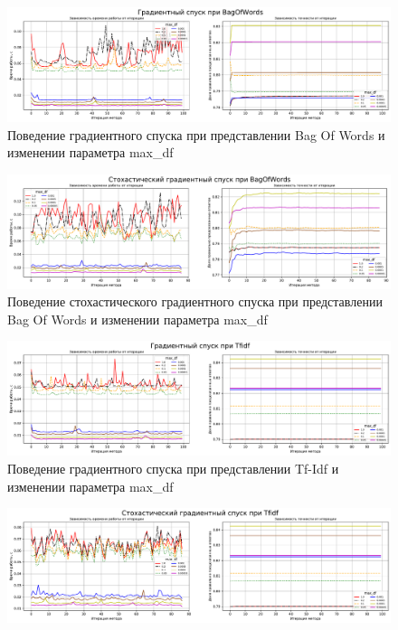\documentclass{article}
\begin{document}
\begin{itemize}
\begin{figure}[H]
	\centering
	\includegraphics[width=15cm]{TASK2 max_df BagOfWords GD.pdf}
	\caption{Поведение градиентного спуска при представлении Bag Of Words и изменении параметра max\_df}
	\label{fig:max_df_BagOfWords_GD}
\end{figure}
\begin{figure}[H]
	\centering
	\includegraphics[width=15cm]{TASK2 max_df BagOfWords SGD.pdf}
	\caption{Поведение стохастического градиентного спуска при представлении Bag Of Words и изменении параметра max\_df}
	\label{fig:max_df_BagOfWords_SGD}
\end{figure}
\begin{figure}[H]
	\centering
	\includegraphics[width=15cm]{TASK2 max_df Tfidf GD.pdf}
	\caption{Поведение градиентного спуска при представлении Tf-Idf и изменении параметра max\_df}
	\label{fig:max_df_Tfidf_GD}
\end{figure}
\begin{figure}[H]
	\centering
	\includegraphics[width=15cm]{TASK2 max_df Tfidf SGD.pdf}

\end{figure}
\end{itemize}
\end{document}
